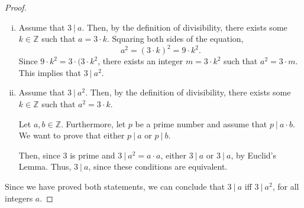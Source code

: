 \documentclass{article}
\begin{document}
\begin{enumerate}
\begin{proof}
                    \begin{enumerate}[i.]
                        \item Assume that $3\ |\ a$. Then, by the definition of divisibility, there exists some $k\in\mathbb{Z}$ such that $a = 3\cdot k$. Squaring both sides of the equation,
                            \[
                                a^2 = (3\cdot k)^2 = 9\cdot k^2.
                            \]
                        \ppar Since $9\cdot k^2 = 3\cdot(3\cdot k^2$, there exists an integer $m = 3\cdot k^2$ such that $a^2 = 3\cdot m$. This implies that $3\ |\ a^2$. \\
                        \item Assume that $3\ |\ a^2$. Then, by the definition of divisibility, there exists some $k\in\mathbb{Z}$ such that $a^2 = 3\cdot k$.
                            \begin{subproof}
                                Let $a,b\in\mathbb{Z}$. Furthermore, let $p$ be a prime number and assume that $p\ |\ a\cdot b$. We want to prove that either $p\ | \ a$ or $p\ | \ b$.
                                \begin{caseof}
                                \end{caseof}
                            \end{subproof}
                        Then, since $3$ is prime and $3\ |\ a^2 = a\cdot a$, either $3\ |\ a$ or $3\ |\ a$, by Euclid's Lemma. Thus, $3\ |\ a$, since these conditions are equivalent. 
                    
                    \end{enumerate}
                    Since we have proved both statements, we can conclude that $3\ |\ a$ iff $3\ |\ a^2$, for all integers $a$.
                \end{proof}


\end{enumerate}
\end{document}

